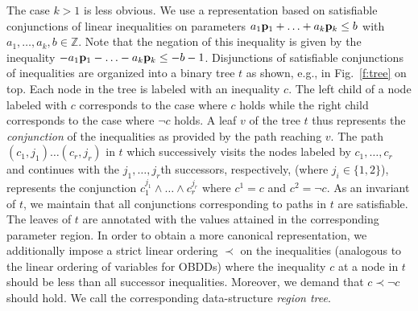 \documentclass[a4paper]{easychair}
\newcommand{\ZZ}{\mathbb{Z}}
\begin{document}
The case $k>1$ is less obvious. 
We use a representation based on 
satisfiable conjunctions of linear inequalities on parameters $a_1{\bf p}_1+\ldots+a_k{\bf p}_k\leq b$ with $a_1,\ldots,a_k,b\in\ZZ$.
Note that the negation of this inequality is given by the inequality 
$-a_1{\bf p}_1-\ldots -a_k{\bf p}_k\leq - b - 1$.
Disjunctions of satisfiable conjunctions of inequalities are organized into a binary tree $t$
as shown, e.g., in Fig.\ \ref{f:tree} on top. Each node in the tree is labeled with
an inequality $c$.
The left child of a node labeled with $c$ corresponds to the case where $c$ holds 
while the right child corresponds to the case where $\neg c$ holds. 
A leaf $v$ of the tree $t$ thus represents the \emph{conjunction} of the inequalities as provided by the
path reaching $v$. 
The path $(c_1,j_1)\ldots(c_r,j_r)$ in $t$ which successively visits the nodes labeled by 
$c_1,\ldots,c_r$ and continues with the $j_1,\ldots,j_r$th successors, respectively,
(where $j_i\in\{1,2\}$), represents the conjunction 
$c_1^{j_1}\wedge\ldots\wedge c_r^{j_r}$ where 
$c^1 = c$ and $c^2 = \neg c$.
As an invariant of $t$, 
we maintain that all conjunctions corresponding to paths in $t$ are
satisfiable.
The leaves of $t$ are annotated with the values attained
in the corresponding parameter region. 
In order to obtain a more canonical representation, we additionally impose 
a strict linear ordering $\prec$ on the inequalities 
(analogous to the linear ordering of variables for OBDDs)
where the inequality $c$ at a node in $t$ should be less than all successor inequalities. 
Moreover, we demand that $c\prec \neg c$ should hold.
We call the corresponding data-structure \emph{region tree}. 
\end{document}
